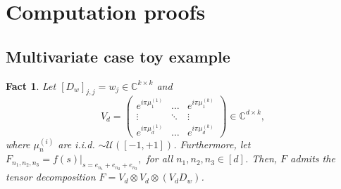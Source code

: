 \documentclass[11pt]{article}
\newtheorem{fact}[theorem]{Fact}
\begin{document}
\section{Computation proofs}
\subsection{Multivariate case toy example}
\begin{fact}
    Let $[D_w]_{j,j}=w_j\in\mathbb{C}^{k\times k}$ and 
    \begin{equation}
        V_d=\begin{pmatrix}
            e^{i\pi\mu_1^{(1)}}&\ldots&e^{i\pi\mu_1^{(k)}}\\
            \vdots&\ddots&\vdots\\
            e^{i\pi\mu_d^{(1)}}&\ldots&e^{i\pi\mu_d^{(k)}}
        \end{pmatrix}\in\mathbb{C}^{d\times k},
        \label{eqn:Vd}
    \end{equation} where $\mu_n^{(i)}$ are i.i.d. $\sim\mathcal{U}([-1,+1])$. Furthermore, let $F_{n_1,n_2,n_3}=f(s)\big|_{s=e_{n_1}+e_{n_2}+e_{n_3}},$ for all $n_1,n_2,n_3\in[d]$. Then, $F$ admits the tensor decomposition $F=V_d\otimes V_d\otimes(V_dD_w)$.
\end{fact}
\end{document}
